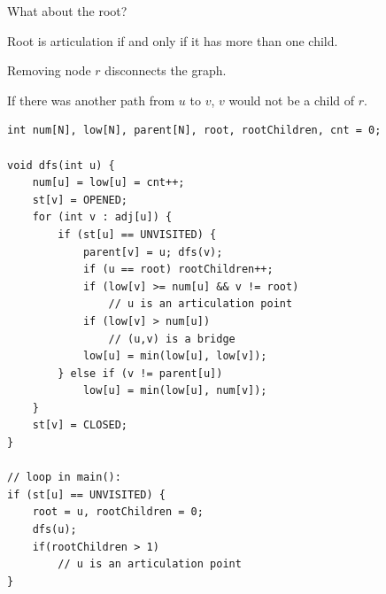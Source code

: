 \documentclass[10pt]{beamer}
\begin{document}
\begin{frame}

What about the root? \pause 

\vspace{0.5cm}

Root is articulation if and only if it has more than one child.

\vspace{0.5cm}

\begin{center}
\end{center}

\vspace{0.5cm}

Removing node $r$ disconnects the graph.

\vspace{0.5cm}

If there was another path from $u$ to $v$, $v$ would not be a child of $r$.

\end{frame}


\begin{frame}[fragile]

\begin{lstlisting}
int num[N], low[N], parent[N], root, rootChildren, cnt = 0;

void dfs(int u) {
    num[u] = low[u] = cnt++;
    st[v] = OPENED;
    for (int v : adj[u]) {
        if (st[u] == UNVISITED) {
            parent[v] = u; dfs(v);
            if (u == root) rootChildren++;
            if (low[v] >= num[u] && v != root)
                // u is an articulation point
            if (low[v] > num[u])
                // (u,v) is a bridge
            low[u] = min(low[u], low[v]);
        } else if (v != parent[u])
            low[u] = min(low[u], num[v]);
    }
    st[v] = CLOSED;
}

// loop in main():
if (st[u] == UNVISITED) {
    root = u, rootChildren = 0;
    dfs(u);
    if(rootChildren > 1)
        // u is an articulation point
}
\end{lstlisting}

\end{frame}
\end{document}
